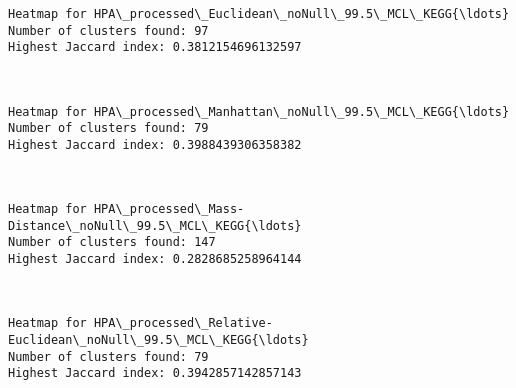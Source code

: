 \documentclass[11pt]{article}
\begin{document}
    \begin{Verbatim}[commandchars=\\\{\}]
Heatmap for HPA\_processed\_Euclidean\_noNull\_99.5\_MCL\_KEGG{\ldots}
Number of clusters found: 97
Highest Jaccard index: 0.3812154696132597

    \end{Verbatim}

    \begin{center}
    \end{center}
    { \hspace*{\fill} \\}
    
    \begin{Verbatim}[commandchars=\\\{\}]
Heatmap for HPA\_processed\_Manhattan\_noNull\_99.5\_MCL\_KEGG{\ldots}
Number of clusters found: 79
Highest Jaccard index: 0.3988439306358382

    \end{Verbatim}

    \begin{center}
    \end{center}
    { \hspace*{\fill} \\}
    
    \begin{Verbatim}[commandchars=\\\{\}]
Heatmap for HPA\_processed\_Mass-Distance\_noNull\_99.5\_MCL\_KEGG{\ldots}
Number of clusters found: 147
Highest Jaccard index: 0.2828685258964144

    \end{Verbatim}

    \begin{center}
    \end{center}
    { \hspace*{\fill} \\}
    
    \begin{Verbatim}[commandchars=\\\{\}]
Heatmap for HPA\_processed\_Relative-Euclidean\_noNull\_99.5\_MCL\_KEGG{\ldots}
Number of clusters found: 79
Highest Jaccard index: 0.3942857142857143

    \end{Verbatim}
\end{document}
